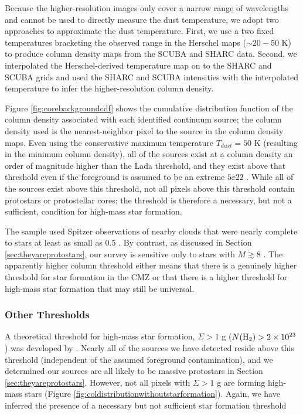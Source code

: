 \documentclass[twocolumn]{aastex61}
\begin{document}
Because the higher-resolution images only cover a narrow range of wavelengths
and cannot be used to directly measure the dust temperature, we adopt two
approaches to approximate the dust temperature.  First, we use a two fixed
temperatures bracketing the observed range in the Herschel maps ($\sim20-50$ K)
to produce column density maps from the SCUBA and SHARC data.  Second, we
interpolated the Herschel-derived temperature map on to the SHARC and SCUBA
grids and used the SHARC and SCUBA intensities with the interpolated
temperature to infer the higher-resolution column density.

Figure \ref{fig:corebackgroundcdf} shows the cumulative distribution function
of the column density associated with each identified continuum source; the
column density used is the nearest-neighbor pixel to the source in the column
density maps.  Even using the conservative maximum temperature $T_{dust}=50$ K
(resulting in the minimum column density), all of the sources exist at a column
density an order of magnitude higher than the Lada threshold, and they exist
above that threshold even if the foreground is assumed to be an extreme
$5\ee{22}$ \persc.  While all of the sources exist above this threshold, not
all pixels above this threshold contain protostars or protostellar cores; the
threshold is therefore a necessary, but not a sufficient, condition for
high-mass star formation.


The \citet{Lada2010a} sample used Spitzer observations of nearby clouds that
were nearly complete to stars at least as small as 0.5 \msun.  By contrast, as
discussed in Section \ref{sec:theyareprotostars}, our survey is sensitive only
to stars with $M\gtrsim8$ \msun.  The apparently higher column threshold either
means that there is a genuinely higher threshold for star formation in the CMZ
or that there is a higher threshold for high-mass star formation that may still
be universal.  

\subsubsection{Other Thresholds}
\label{sec:otherthresholds}

A theoretical threshold for high-mass star formation, $\Sigma > 1$ g \persc
($N(\textrm{H}_{2}) > 2\times10^{23}$ \persc) was developed by \citet{Krumholz2008a}.   Nearly
all of the sources we have detected reside above this threshold (independent of
the assumed foreground contamination), and we determined our sources are all
likely to be massive protostars in Section \ref{sec:theyareprotostars}.
However, not all pixels with $\Sigma > 1$ g \persc are forming high-mass stars
(Figure \ref{fig:coldistributionwithoutstarformation}).  Again, we have
inferred the presence of a necessary but not sufficient star formation
threshold
\end{document}

